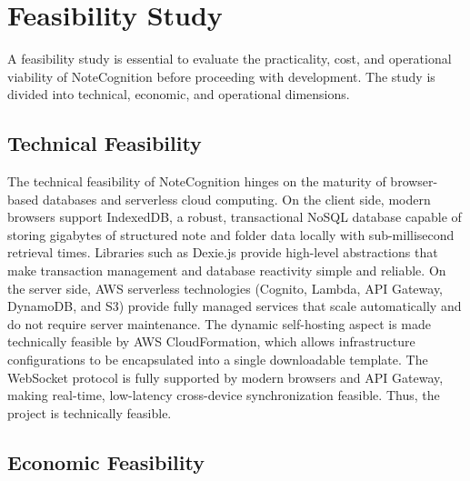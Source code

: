 \documentclass[12pt, a4paper, oneside]{report}
\begin{document}
\section{Feasibility Study}

A feasibility study is essential to evaluate the practicality, cost, and operational viability of NoteCognition before proceeding with development. The study is divided into technical, economic, and operational dimensions.

\subsection{Technical Feasibility}

The technical feasibility of NoteCognition hinges on the maturity of browser-based databases and serverless cloud computing. On the client side, modern browsers support IndexedDB, a robust, transactional NoSQL database capable of storing gigabytes of structured note and folder data locally with sub-millisecond retrieval times. Libraries such as Dexie.js provide high-level abstractions that make transaction management and database reactivity simple and reliable. On the server side, AWS serverless technologies (Cognito, Lambda, API Gateway, DynamoDB, and S3) provide fully managed services that scale automatically and do not require server maintenance. The dynamic self-hosting aspect is made technically feasible by AWS CloudFormation, which allows infrastructure configurations to be encapsulated into a single downloadable template. The WebSocket protocol is fully supported by modern browsers and API Gateway, making real-time, low-latency cross-device synchronization feasible. Thus, the project is technically feasible.

\subsection{Economic Feasibility}
\end{document}
